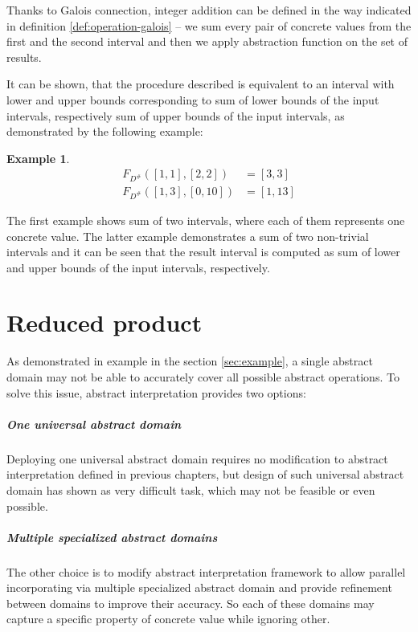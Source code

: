 \documentclass[12pt,oneside]{fithesis2}
\theoremstyle{definition}
\newtheorem{exmp}{Example}[section]
\begin{document}
Thanks to Galois connection, integer addition can be defined in the way indicated in definition \ref{def:operation-galois} -- we sum every pair of concrete values from the first and the second interval and then we apply abstraction function on the set of results.

It can be shown, that the procedure described is equivalent to an interval with lower and upper bounds corresponding to sum of lower bounds of the input intervals, respectively sum of upper bounds of the input intervals, as demonstrated by the following example:

\begin{exmp}
  \begin{align*}
    F_{D^\#}([1,1], [2,2]) &= [3,3]\\
    F_{D^\#}([1,3], [0,10]) &= [1,13]
  \end{align*}
\end{exmp}

The first example shows sum of two intervals, where each of them represents one concrete value. The latter example demonstrates a sum of two non-trivial intervals and it can be seen that the result interval is computed as sum of lower and upper bounds of the input intervals, respectively.

\chapter{Reduced product}\label{ch:reduced-product}

As demonstrated in example in the section \ref{sec:example}, a single abstract domain may not be able to accurately cover all possible abstract operations. To solve this issue, abstract interpretation provides two options:

\paragraph{One universal abstract domain}
Deploying one universal abstract domain requires no modification to abstract interpretation defined in previous chapters, but design of such universal abstract domain has shown as very difficult task, which may not be feasible or even possible.

\paragraph{Multiple specialized abstract domains}
The other choice is to modify abstract interpretation framework to allow parallel incorporating via multiple specialized abstract domain and provide refinement between domains to improve their accuracy. So each of these domains may capture a specific property of concrete value while ignoring other.
\end{document}
